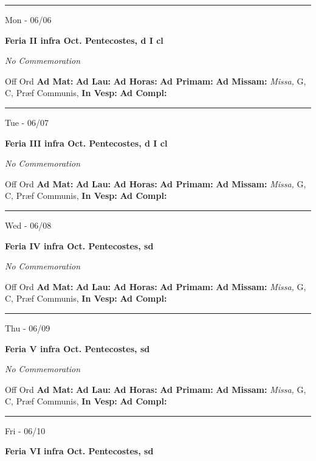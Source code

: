 \documentclass[letterpaper, 10pt]{article}
\begin{document}
\hrule
\begin{center}
Mon - 06/06
\end{center}\textbf{ \large Feria II infra Oct. Pentecostes, \textnormal{\normalsize d I cl}}

\textit{No Commemoration}\begin{justify}
Off Ord
\textbf{Ad Mat: }
\textbf{Ad Lau: }
\textbf{Ad Horas: }
\textbf{Ad Primam: }
\textbf{Ad Missam:} \textit{Missa, } G, C, Præf Communis, 
\textbf{In Vesp: }
\textbf{Ad Compl: }\end{justify}



\hrule
\begin{center}
Tue - 06/07
\end{center}\textbf{ \large Feria III infra Oct. Pentecostes, \textnormal{\normalsize d I cl}}

\textit{No Commemoration}\begin{justify}
Off Ord
\textbf{Ad Mat: }
\textbf{Ad Lau: }
\textbf{Ad Horas: }
\textbf{Ad Primam: }
\textbf{Ad Missam:} \textit{Missa, } G, C, Præf Communis, 
\textbf{In Vesp: }
\textbf{Ad Compl: }\end{justify}



\hrule
\begin{center}
Wed - 06/08
\end{center}\textbf{ \large Feria IV infra Oct. Pentecostes, \textnormal{\normalsize sd}}

\textit{No Commemoration}\begin{justify}
Off Ord
\textbf{Ad Mat: }
\textbf{Ad Lau: }
\textbf{Ad Horas: }
\textbf{Ad Primam: }
\textbf{Ad Missam:} \textit{Missa, } G, C, Præf Communis, 
\textbf{In Vesp: }
\textbf{Ad Compl: }\end{justify}



\hrule
\begin{center}
Thu - 06/09
\end{center}\textbf{ \large Feria V infra Oct. Pentecostes, \textnormal{\normalsize sd}}

\textit{No Commemoration}\begin{justify}
Off Ord
\textbf{Ad Mat: }
\textbf{Ad Lau: }
\textbf{Ad Horas: }
\textbf{Ad Primam: }
\textbf{Ad Missam:} \textit{Missa, } G, C, Præf Communis, 
\textbf{In Vesp: }
\textbf{Ad Compl: }\end{justify}



\hrule
\begin{center}
Fri - 06/10
\end{center}\textbf{ \large Feria VI infra Oct. Pentecostes, \textnormal{\normalsize sd}}
\end{document}
